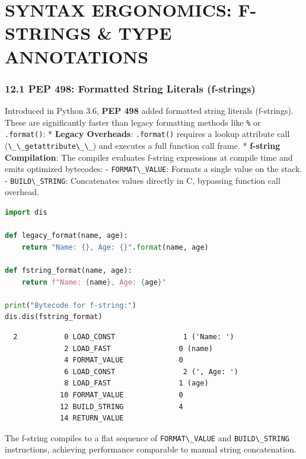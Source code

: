 \hypertarget{syntax-ergonomics-f-strings-type-annotations}{%
\chapter{SYNTAX ERGONOMICS: F-STRINGS \& TYPE
ANNOTATIONS}\label{syntax-ergonomics-f-strings-type-annotations}}

\hypertarget{pep-498-formatted-string-literals-f-strings}{%
\subsection{12.1 PEP 498: Formatted String Literals
(f-strings)}\label{pep-498-formatted-string-literals-f-strings}}

Introduced in Python 3.6, \textbf{PEP 498} added formatted string
literals (f-strings). These are significantly faster than legacy
formatting methods like \passthrough{\lstinline!\%!} or
\passthrough{\lstinline!.format()!}: * \textbf{Legacy Overheads}:
\passthrough{\lstinline!.format()!} requires a lookup attribute call
(\passthrough{\lstinline!\_\_getattribute\_\_!}) and executes a full
function call frame. * \textbf{f-string Compilation}: The compiler
evaluates f-string expressions at compile time and emits optimized
bytecodes: - \passthrough{\lstinline!FORMAT\_VALUE!}: Formats a single
value on the stack. - \passthrough{\lstinline!BUILD\_STRING!}:
Concatenates values directly in C, bypassing function call overhead.

\begin{lstlisting}[language=Python]
import dis

def legacy_format(name, age):
    return "Name: {}, Age: {}".format(name, age)

def fstring_format(name, age):
    return f"Name: {name}, Age: {age}"

print("Bytecode for f-string:")
dis.dis(fstring_format)
\end{lstlisting}

\begin{lstlisting}
  2           0 LOAD_CONST                1 ('Name: ')
              2 LOAD_FAST                0 (name)
              4 FORMAT_VALUE             0
              6 LOAD_CONST                2 (', Age: ')
              8 LOAD_FAST                1 (age)
             10 FORMAT_VALUE             0
             12 BUILD_STRING             4
             14 RETURN_VALUE
\end{lstlisting}

The f-string compiles to a flat sequence of
\passthrough{\lstinline!FORMAT\_VALUE!} and
\passthrough{\lstinline!BUILD\_STRING!} instructions, achieving
performance comparable to manual string concatenation.

